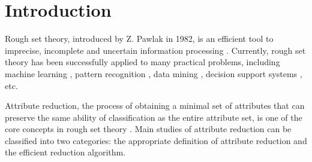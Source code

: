 \documentclass[review]{elsarticle}
\begin{document}
\linenumbers

\section{Introduction}
	\par Rough set theory, introduced by Z. Pawlak \cite{Pawlak1982} in 1982, is an efficient tool to imprecise, incomplete and uncertain information processing \cite{Huang2016,Dai2012,Shi2016,zhan2017}. Currently, rough set theory has been successfully applied to many practical problems, including machine learning \cite{das2016ierspop,xie2018test}, pattern recognition \cite{hu2015flow,huang2012enhanced}, data mining \cite{wang2013attribute}, decision support systems \cite{kaya2013hybrid}, etc.
	
	\par Attribute reduction, the process of obtaining a minimal set of attributes that can preserve the same ability of classification as the entire attribute set, is one of the core concepts in rough set theory \cite{thangavel2009}. Main studies of attribute reduction can be classified into two categories: the appropriate definition of attribute reduction and the efficient reduction algorithm.
	
\end{document}
